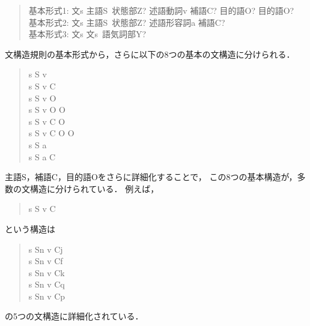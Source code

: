 \documentclass[japanese]{jnlp_1.3a}
\begin{document}
\begin{quotation}\noindent
基本形式1: 文s \ya 主語S\ 状態部Z? 述語動詞v 補語C? 目的語O? 目的語O?\\
基本形式2: 文s \ya 主語S\ 状態部Z? 述語形容詞a 補語C?\\
基本形式3: 文s \ya 文s\ 語気詞部Y?
\end{quotation}
文構造規則の基本形式から，さらに以下の8つの基本の文構造に分けられる．
\begin{quotation}\noindent
 s  \ya  S v\\
 s  \ya  S v C\\
 s  \ya  S v O\\
 s  \ya  S v O O\\
 s  \ya  S v C O\\
 s  \ya  S v C O O\\
 s  \ya  S a\\
 s  \ya  S a C
\end{quotation}
主語S，補語C，目的語Oをさらに詳細化することで，
この8つの基本構造が，多数の文構造に分けられている．
例えば，
\begin{quotation}\noindent
 s \ya S v C
\end{quotation}
という構造は
\begin{quotation}\noindent
 s \ya Sn v Cj\\
 s \ya Sn v Cf\\
 s \ya Sn v Ck\\
 s \ya Sn v Cq\\
 s \ya Sn v Cp
\end{quotation}
の5つの文構造に詳細化されている．
\end{document}
